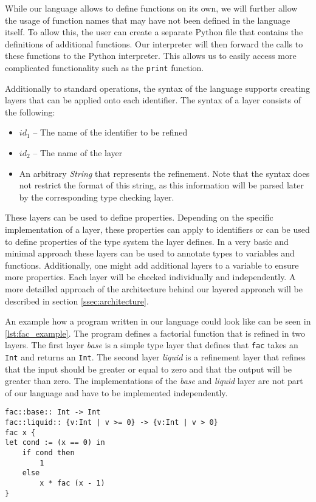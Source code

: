 While our language allows to define functions on its own, we will further allow the usage of function names that may have not been defined in the language itself. To allow this, the user can create a separate Python file that contains the definitions of additional functions. Our interpreter will then forward the calls to these functions to the Python interpreter. This allows us to easily access more complicated functionality such as the \texttt{print} function.

Additionally to standard operations, the syntax of the language supports creating layers that can be applied onto each identifier. The syntax of a layer consists of the following:
\begin{itemize}
	\item $id_1$ -- The name of the identifier to be refined
	\item $id_2$ -- The name of the layer
	\item An arbitrary \textit{String} that represents the refinement. Note that the syntax does not restrict the format of this string, as this information will be parsed later by the corresponding type checking layer.
\end{itemize}

These layers can be used to define properties. Depending on the specific implementation of a layer, these properties can apply to identifiers or can be used to define properties of the type system the layer defines. In a very basic and minimal approach these layers can be used to annotate types to variables and functions. Additionally, one might add additional layers to a variable to ensure more properties. Each layer will be checked individually and independently. A more detailled approach of the architecture behind our layered approach will be described in section \ref{ssec:architecture}.

An example how a program written in our language could look like can be seen in \ref{lst:fac_example}. The program defines a factorial function that is refined in two layers. The first layer \textit{base} is a simple type layer that defines that \texttt{fac} takes an \texttt{Int} and returns an \texttt{Int}. The second layer \textit{liquid} is a refinement layer that refines that the input should be greater or equal to zero and that the output will be greater than zero. The implementations of the \textit{base} and \textit{liquid} layer are not part of our language and have to be implemented independently.

\begin{lstlisting}[caption={Example of a factorial function in our simple language}, label={lst:fac_example}]
fac::base:: Int -> Int
fac::liquid:: {v:Int | v >= 0} -> {v:Int | v > 0}
fac x { 
let cond := (x == 0) in
	if cond then 
		1 
	else 
		x * fac (x - 1) 
}
\end{lstlisting}


